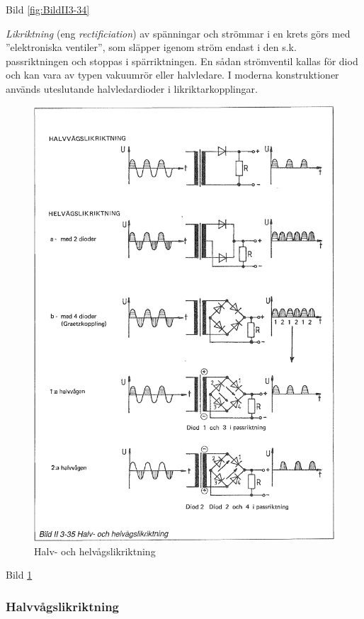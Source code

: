 Bild \ref{fig:BildII3-34}

\emph{Likriktning} (eng \emph{rectificiation}) av spänningar och strömmar i en
krets görs med ''elektroniska ventiler'', som släpper igenom ström endast i den
s.k. passriktningen och stoppas i spärriktningen. En sådan strömventil
kallas för diod och kan vara av typen vakuumrör eller halvledare. I
moderna konstruktioner används uteslutande halvledardioder i
likriktarkopplingar.

\begin{figure}
\includegraphics[width=\textwidth]{images/bild_2_3-35}
\caption{Halv- och helvågslikriktning}
\label{fig:BildII3-35}
\end{figure}

Bild \ref{fig:BildII3-35}

\subsubsection{Halvvågslikriktning}


